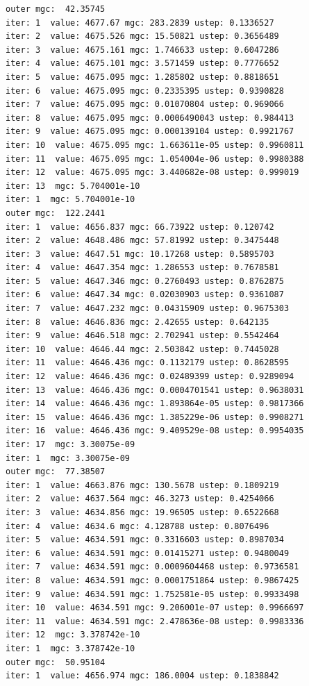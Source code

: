 \documentclass[
  letterpaper,
  DIV=11,
  numbers=noendperiod]{scrartcl}
\begin{document}
\begin{verbatim}
outer mgc:  42.35745 
iter: 1  value: 4677.67 mgc: 283.2839 ustep: 0.1336527 
iter: 2  value: 4675.526 mgc: 15.50821 ustep: 0.3656489 
iter: 3  value: 4675.161 mgc: 1.746633 ustep: 0.6047286 
iter: 4  value: 4675.101 mgc: 3.571459 ustep: 0.7776652 
iter: 5  value: 4675.095 mgc: 1.285802 ustep: 0.8818651 
iter: 6  value: 4675.095 mgc: 0.2335395 ustep: 0.9390828 
iter: 7  value: 4675.095 mgc: 0.01070804 ustep: 0.969066 
iter: 8  value: 4675.095 mgc: 0.0006490043 ustep: 0.984413 
iter: 9  value: 4675.095 mgc: 0.000139104 ustep: 0.9921767 
iter: 10  value: 4675.095 mgc: 1.663611e-05 ustep: 0.9960811 
iter: 11  value: 4675.095 mgc: 1.054004e-06 ustep: 0.9980388 
iter: 12  value: 4675.095 mgc: 3.440682e-08 ustep: 0.999019 
iter: 13  mgc: 5.704001e-10 
iter: 1  mgc: 5.704001e-10 
outer mgc:  122.2441 
iter: 1  value: 4656.837 mgc: 66.73922 ustep: 0.120742 
iter: 2  value: 4648.486 mgc: 57.81992 ustep: 0.3475448 
iter: 3  value: 4647.51 mgc: 10.17268 ustep: 0.5895703 
iter: 4  value: 4647.354 mgc: 1.286553 ustep: 0.7678581 
iter: 5  value: 4647.346 mgc: 0.2760493 ustep: 0.8762875 
iter: 6  value: 4647.34 mgc: 0.02030903 ustep: 0.9361087 
iter: 7  value: 4647.232 mgc: 0.04315909 ustep: 0.9675303 
iter: 8  value: 4646.836 mgc: 2.42655 ustep: 0.642135 
iter: 9  value: 4646.518 mgc: 2.702941 ustep: 0.5542464 
iter: 10  value: 4646.44 mgc: 2.503842 ustep: 0.7445028 
iter: 11  value: 4646.436 mgc: 0.1132179 ustep: 0.8628595 
iter: 12  value: 4646.436 mgc: 0.02489399 ustep: 0.9289094 
iter: 13  value: 4646.436 mgc: 0.0004701541 ustep: 0.9638031 
iter: 14  value: 4646.436 mgc: 1.893864e-05 ustep: 0.9817366 
iter: 15  value: 4646.436 mgc: 1.385229e-06 ustep: 0.9908271 
iter: 16  value: 4646.436 mgc: 9.409529e-08 ustep: 0.9954035 
iter: 17  mgc: 3.30075e-09 
iter: 1  mgc: 3.30075e-09 
outer mgc:  77.38507 
iter: 1  value: 4663.876 mgc: 130.5678 ustep: 0.1809219 
iter: 2  value: 4637.564 mgc: 46.3273 ustep: 0.4254066 
iter: 3  value: 4634.856 mgc: 19.96505 ustep: 0.6522668 
iter: 4  value: 4634.6 mgc: 4.128788 ustep: 0.8076496 
iter: 5  value: 4634.591 mgc: 0.3316603 ustep: 0.8987034 
iter: 6  value: 4634.591 mgc: 0.01415271 ustep: 0.9480049 
iter: 7  value: 4634.591 mgc: 0.0009604468 ustep: 0.9736581 
iter: 8  value: 4634.591 mgc: 0.0001751864 ustep: 0.9867425 
iter: 9  value: 4634.591 mgc: 1.752581e-05 ustep: 0.9933498 
iter: 10  value: 4634.591 mgc: 9.206001e-07 ustep: 0.9966697 
iter: 11  value: 4634.591 mgc: 2.478636e-08 ustep: 0.9983336 
iter: 12  mgc: 3.378742e-10 
iter: 1  mgc: 3.378742e-10 
outer mgc:  50.95104 
iter: 1  value: 4656.974 mgc: 186.0004 ustep: 0.1838842 

\end{verbatim}
\end{document}
